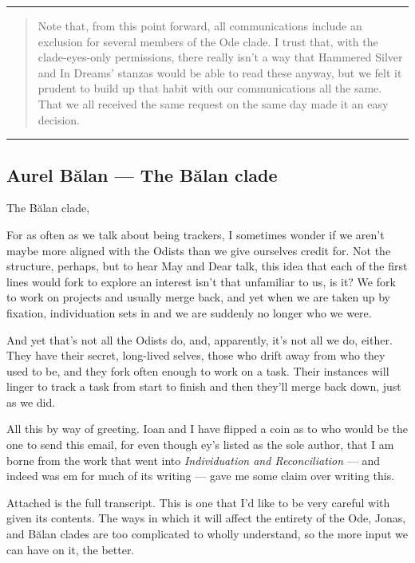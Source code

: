 \begin{center}\rule{0.5\linewidth}{0.5pt}\end{center}

\begin{quote}
Note that, from this point forward, all communications include an exclusion for several members of the Ode clade. I trust that, with the clade-eyes-only permissions, there really isn't a way that Hammered Silver and In Dreams' stanzas would be able to read these anyway, but we felt it prudent to build up that habit with our communications all the same. That we all received the same request on the same day made it an easy decision.
\end{quote}

\begin{center}\rule{0.5\linewidth}{0.5pt}\end{center}

\hypertarget{aurel-bux103lan-the-bux103lan-clade}{%
\subsection{Aurel Bălan — The Bălan clade}\label{aurel-bux103lan-the-bux103lan-clade}}

The Bălan clade,

For as often as we talk about being trackers, I sometimes wonder if we aren't maybe more aligned with the Odists than we give ourselves credit for. Not the structure, perhaps, but to hear May and Dear talk, this idea that each of the first lines would fork to explore an interest isn't that unfamiliar to us, is it? We fork to work on projects and usually merge back, and yet when we are taken up by fixation, individuation sets in and we are suddenly no longer who we were.

And yet that's not all the Odists do, and, apparently, it's not all we do, either. They have their secret, long-lived selves, those who drift away from who they used to be, and they fork often enough to work on a task. Their instances will linger to track a task from start to finish and then they'll merge back down, just as we did.

All this by way of greeting. Ioan and I have flipped a coin as to who would be the one to send this email, for even though ey's listed as the sole author, that I am borne from the work that went into \emph{Individuation and Reconciliation} — and indeed was em for much of its writing — gave me some claim over writing this.

Attached is the full transcript. This is one that I'd like to be very careful with given its contents. The ways in which it will affect the entirety of the Ode, Jonas, and Bălan clades are too complicated to wholly understand, so the more input we can have on it, the better.

